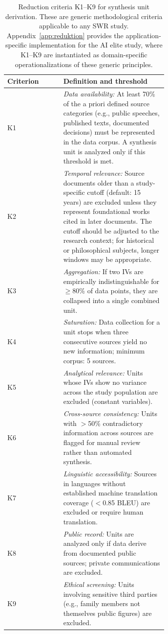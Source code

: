 \documentclass[11pt,a4paper]{article}
\theoremstyle{definition}
\theoremstyle{plain}
\theoremstyle{remark}
\begin{document}
\begin{table}[ht]
\centering
\small
\caption{Reduction criteria K1--K9 for synthesis unit derivation. These are generic methodological criteria applicable to any SWR study. Appendix~\ref{app:reduktion} provides the application-specific implementation for the AI elite study, where K1--K9 are instantiated as domain-specific operationalizations of these generic principles.}
\label{tab:reduction_criteria}
\begin{tabular}{lp{0.65\linewidth}}
\toprule
Criterion & Definition and threshold \\
\midrule
K1 & \emph{Data availability:} At least 70\% of the a priori defined source categories (e.g., public speeches, published texts, documented decisions) must be represented in the data corpus. A synthesis unit is analyzed only if this threshold is met. \\
K2 & \emph{Temporal relevance:} Source documents older than a study-specific cutoff (default: 15 years) are excluded unless they represent foundational works cited in later documents. The cutoff should be adjusted to the research context; for historical or philosophical subjects, longer windows may be appropriate. \\
K3 & \emph{Aggregation:} If two IVs are empirically indistinguishable for $\geq$80\% of data points, they are collapsed into a single combined unit. \\
K4 & \emph{Saturation:} Data collection for a unit stops when three consecutive sources yield no new information; minimum corpus: 5 sources. \\
K5 & \emph{Analytical relevance:} Units whose IVs show no variance across the study population are excluded (constant variables). \\
K6 & \emph{Cross-source consistency:} Units with $>$50\% contradictory information across sources are flagged for manual review rather than automated synthesis. \\
K7 & \emph{Linguistic accessibility:} Sources in languages without established machine translation coverage ($<$0.85 BLEU) are excluded or require human translation. \\
K8 & \emph{Public record:} Units are analyzed only if data derive from documented public sources; private communications are excluded. \\
K9 & \emph{Ethical screening:} Units involving sensitive third parties (e.g., family members not themselves public figures) are excluded. \\
\bottomrule
\end{tabular}
\end{table}
\end{document}
